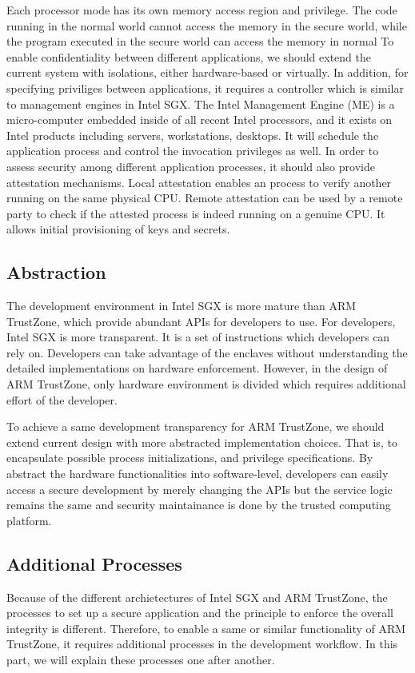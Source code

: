 Each processor mode has its own memory access region and privilege. The code 
running in the normal world cannot access the memory in the secure world, 
while the program executed in the secure world can access the memory in normal
To enable confidentiality between different applications, we should extend the
current system with isolations, either hardware-based or virtually. In 
addition, for specifying priviliges between applications, it requires a
controller which is similar to management engines in Intel SGX. The Intel 
Management Engine (ME) is a micro-computer embedded inside of all recent Intel
processors, and it exists on Intel products including servers, workstations, 
desktops. It will  schedule the application process and control the invocation 
privileges as well. In order to assess security among different application 
processes, it should also provide attestation mechanisms. Local attestation 
enables an process to verify another running on the same physical CPU. Remote 
attestation can be used by a remote party to check if the attested process is 
indeed running on a genuine CPU. It allows initial provisioning of keys and 
secrets. 

\subsection{Abstraction}
The development environment in Intel SGX is more mature than ARM TrustZone,
which provide abundant APIs for developers to use. For developers, Intel SGX 
is more transparent. It is a set of instructions which developers can rely on. 
Developers can take advantage of the enclaves without understanding the 
detailed implementations on hardware enforcement. However, in the design of 
ARM TrustZone, only hardware environment is divided which requires additional
effort of the developer.

To achieve a same development transparency for ARM TrustZone, we should extend 
current design with more abstracted implementation choices. That is, to 
encapsulate possible process initializations, and privilege specifications. By 
abstract the hardware functionalities into software-level, developers can 
easily access a secure development by merely changing the APIs but the service 
logic remains the same and security maintainance is done by the trusted 
computing platform.


\subsection{Additional Processes}
Because of the different archietectures of Intel SGX and ARM TrustZone, the 
processes to set up a secure application and the principle to enforce the 
overall integrity is different. Therefore, to enable a same or similar 
functionality of ARM TrustZone, it requires additional processes in the
development workflow. In this part, we will explain these processes one after
another.

